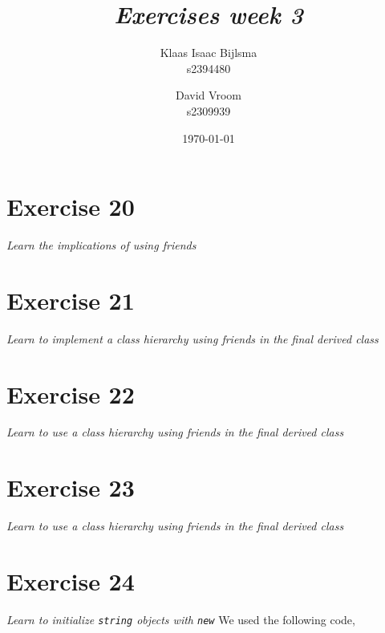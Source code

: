 \documentclass[12pt]{article}
\title{\itshape Exercises week 3}
\author{
	Klaas Isaac Bijlsma \\ s2394480
	\and
	David Vroom \\ s2309939
}
\date{\today}
\newcommand{\desc}[1]{\textit{#1} \vspace{1em}}
\begin{document}
\maketitle

\section*{Exercise 20}
\desc{Learn the implications of using friends}

\clearpage

\section*{Exercise 21}
\desc{Learn to implement a class hierarchy using friends in the final derived class}

\clearpage

\section*{Exercise 22}
\desc{Learn to use a class hierarchy using friends in the final derived class}

\clearpage

\section*{Exercise 23}
\desc{Learn to use a class hierarchy using friends in the final derived class}

\clearpage

\section*{Exercise 24}
\desc{Learn to initialize \texttt{string} objects with \texttt{new}}
We used the following code,







\clearpage
\end{document}
